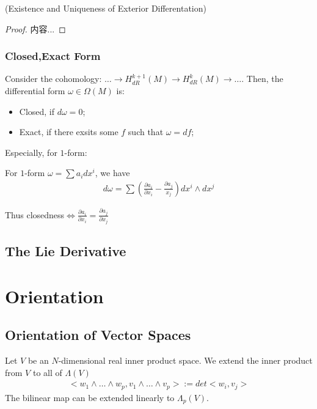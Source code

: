 \documentclass[Total.tex]{subfiles}
\begin{document}
				\begin{theorem}
					(Existence and Uniqueness of Exterior Differentation)
				\end{theorem}
				\begin{proof}
					内容...
				\end{proof}
				
				\subsubsection{Closed,Exact Form}
				\begin{Def}
					Consider the cohomology: $\dots\rightarrow H^{k+1}_{dR}(M)\rightarrow H^k_{dR}(M)\rightarrow\dots$. Then, the differential form $\omega\in \Omega(M)$ is:
					\begin{itemize}
						\item Closed, if $d\omega=0$;
						\item Exact, if there exsits some $f$ such that $\omega=df$;
					\end{itemize}
				\end{Def}
				
				Especially, for $1$-form:
				\begin{proposition}
					For $1$-form $\omega=\sum a_i dx^i$, we have
					\begin{gather*}
						d\omega=\sum (\frac{\partial a_i}{\partial x_i}-\frac{\partial a_j}{x_j})dx^i\wedge dx^j
					\end{gather*}
					
					Thus closedness$\Leftrightarrow \frac{\partial a_i}{\partial x_i}=\frac{\partial a_j}{\partial x_j}$
				\end{proposition}
			\subsection{The Lie Derivative}
		\section{Orientation}
			\subsection{Orientation of Vector Spaces}
				\begin{Def}
					Let $V$ be an $N$-dimensional real inner product space. We extend the inner product from $V$ to all of $\Lambda(V)$
					\begin{gather*}
						<w_1\wedge \dots\wedge w_p,v_1\wedge\dots\wedge v_p>:=det<w_i,v_j>
					\end{gather*}
					The bilinear map can be extended linearly to $\Lambda_p(V)$.
				\end{Def}
				
\end{document}
